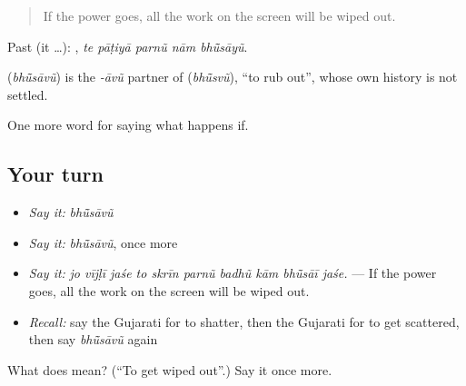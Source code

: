 \begin{quote}
If the power goes, all the work on the screen will be wiped out.
\end{quote}

Past (it …):     , \emph{te pāṭiyā parnũ nām bhū̃sāyũ}.

\begin{cousinweb}
\textbf{} (\emph{bhū̃sāvũ}) is the \emph{-āvũ} partner of \textbf{} (\emph{bhū̃svũ}), \textquotedblleft{}to rub out\textquotedblright{}, whose own history is not settled.
\end{cousinweb}

\begin{grammarlens}[title={What you've built}]
One more word for saying what happens if.
\end{grammarlens}

\subsection*{Your turn}
\begin{itemize}
\raggedright
  \item \emph{Say it:} \emph{bhū̃sāvũ}
  \item \emph{Say it:} \emph{bhū̃sāvũ}, once more
  \item \emph{Say it:} \emph{jo vījḷī jaśe to skrīn parnũ badhũ kām bhū̃sāī jaśe.} — If the power goes, all the work on the screen will be wiped out.
  \item \emph{Recall:} say the Gujarati for to shatter, then the Gujarati for to get scattered, then say \emph{bhū̃sāvũ} again
\end{itemize}

\begin{tcolorbox}[breakable,colback=teal!4,colframe=teal!35!black,title={Before you move on}]
What does  mean? (\textquotedblleft{}To get wiped out\textquotedblright{}.) Say it once more.
\end{tcolorbox}
